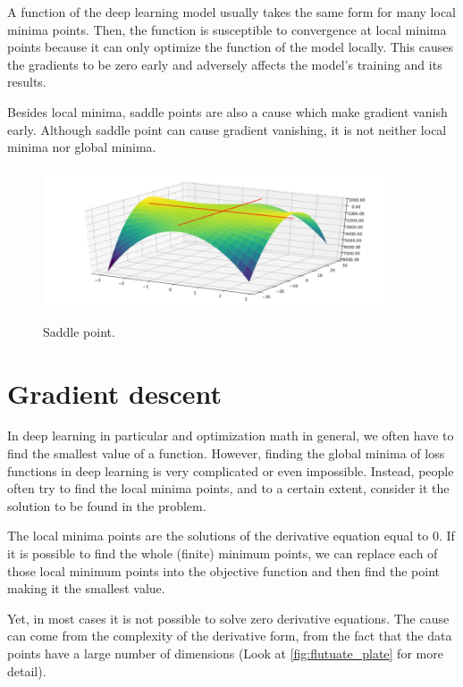 	A function of the deep learning model usually takes the same form for many local minima points. Then, the function is susceptible to convergence at local minima points because it can only optimize the function of the model locally. This causes the gradients to be zero early and adversely affects the model's training and its results.
	
	Besides local minima, saddle points are also a cause which make gradient vanish early. Although saddle point can cause gradient vanishing, it is not neither local minima nor global minima. 
	
	\begin{figure}[H]
		\centering
		{\includegraphics[width=0.9\textwidth]{./hinhanh/chap3/saddle.png}}
		\caption{Saddle point.}
		\label{fig:saddle}
	\end{figure}
	
	
\section{Gradient descent}
\label{section:GD}
\noindent
	
	In deep learning in particular and optimization math in general, we often have to find the smallest value of a function. However, finding the global minima of loss functions in deep learning is very complicated or even impossible. Instead, people often try to find the local minima points, and to a certain extent, consider it the solution to be found in the problem.
	
	The local minima points are the solutions of the derivative equation equal to 0. If it is possible to find the whole (finite) minimum points, we can replace each of those local minimum points into the objective function and then find the point making it the smallest value. 
	
	Yet, in most cases it is not possible to solve zero derivative equations. The cause can come from the complexity of the derivative form, from the fact that the data points have a large number of dimensions (Look at \ref{fig:flutuate_plate} for more detail).
	
